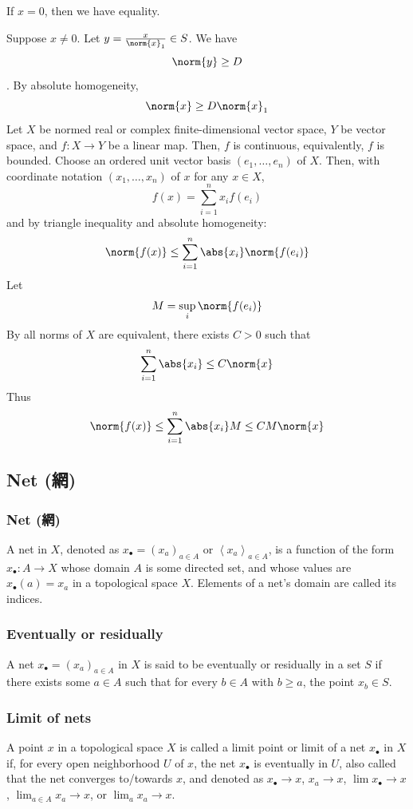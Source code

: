 \documentclass[a4paper,12pt]{article}
\begin{document}
If $x=0$, then we have equality.

Suppose $x\ne 0$. Let $y=\frac{x}{\norm{x}_1}\in S$. We have
\[\norm{y}\ge D\].
By absolute homogeneity,
\[\norm{x}\ge D\norm{x}_1\]
\epr
{}
Let $X$ be normed real or complex finite-dimensional vector space, $Y$ be vector space, and $f\colon X\to Y$ be a linear map. Then, $f$ is continuous, equivalently, $f$ is bounded.
\bpr
Choose an ordered unit vector basis $(e_1,\ldots,e_n)$ of $X$. Then, with coordinate notation $(x_1,\ldots,x_n)$ of $x$ for any $x\in X$,
\[f(x)=\sum_{i=1}^nx_if(e_i)\]
and by triangle inequality and absolute homogeneity:
\[\norm{f(x)}\le\sum_{i=1}^n\abs{x_i}\norm{f(e_i)}\]
Let
\[M=\sup_i\norm{f(e_i)}\]
By all norms of $X$ are equivalent, there exists $C>0$ such that
\[\sum_{i=1}^n\abs{x_i}\le C\norm{x}\]
Thus
\[\norm{f(x)}\le\sum_{i=1}^n\abs{x_i}M\le CM\norm{x}\]
\epr
\subsection{Net (網)}
\subsubsection{Net (網)}
A net in $X$, denoted as $x_{\bullet }=\left(x_{a}\right)_{a\in A}$ or $\left\langle x_{a}\right\rangle _{a\in A}$, is a function of the form $x_{\bullet }\colon A\to X$ whose domain $A$ is some directed set, and whose values are $x_{\bullet }(a)=x_{a}$ in a topological space $X$. Elements of a net's domain are called its indices.
\subsubsection{Eventually or residually}
A net $x_{\bullet }=\left(x_{a}\right)_{a\in A}$ in $X$ is said to be eventually or residually in a set $S$ if there exists some $a\in A$ such that for every $b\in A$ with $b\geq a$, the point $x_b\in S$.
\subsubsection{Limit of nets}
A point $x$ in a topological space $X$ is called a limit point or limit of a net $x_{\bullet }$ in $X$ if, for every open neighborhood $U$ of $x$, the net $x_{\bullet }$ is eventually in $U$, also called that the net converges to/towards $x$, and denoted as $x_{\bullet}\to x$, $x_a\to x$, $\lim x_{\bullet}\to x$, $\lim_{a\in A}x_a\to x$, or $\lim_ax_a\to x$.
\end{document}
